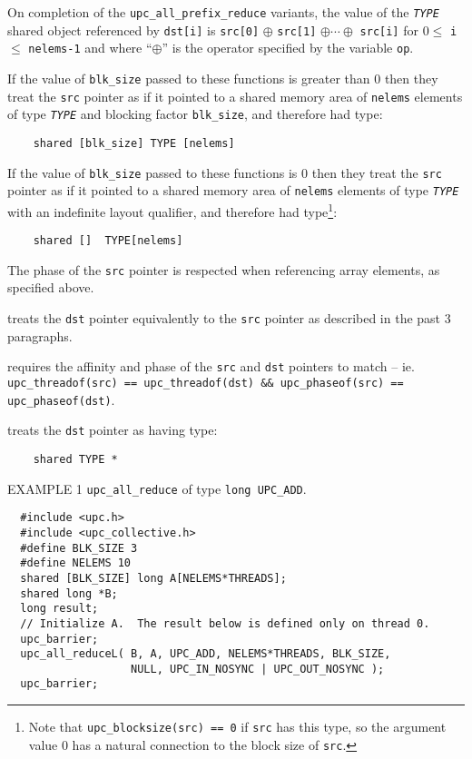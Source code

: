 \np On completion of the {\tt upc\_all\_prefix\_reduce} variants, 
the value of the {\tt{\em TYPE}} shared object
referenced by {\tt dst[i]} is
{\tt src[0]} $\oplus$ {\tt src[1]}
$\oplus \cdots \oplus$ {\tt src[i]}
for $0 \leq$ {\tt i} $\leq$ {\tt nelems-1} and
where ``$\oplus$'' is the operator specified by the variable {\tt op}.

\np
If the value of {\tt blk\_size} passed to these functions is
greater than 0 then they treat the {\tt src} pointer
as if it pointed to a shared memory area of {\tt nelems} elements of
type {\tt{\em TYPE}} and blocking factor {\tt blk\_size}, and therefore
had type:

\begin{verbatim}
    shared [blk_size] TYPE [nelems]
\end{verbatim}

\np
If the value of {\tt blk\_size} passed to these functions is
0 then they treat the {\tt src} pointer
as if it pointed to a shared memory area of {\tt nelems} elements of
type {\tt{\em TYPE}} with an indefinite layout qualifier, and
therefore had
type\footnote{Note that {\tt upc\_blocksize(src) == 0} if
{\tt src} has this type, so the argument value 0 has a natural
connection to the block size of {\tt src}.}:

\begin{verbatim}
    shared []  TYPE[nelems]
\end{verbatim}

\np The phase of the {\tt src} pointer is respected when
referencing array elements, as specified above.

 treats the {\tt dst} pointer
    equivalently to the {\tt src} pointer as described in the past 3
    paragraphs.
    
 requires the affinity and
phase of the {\tt src} and {\tt dst} pointers to match -- ie. 
{\tt upc\_threadof(src) == upc\_threadof(dst) \&\& upc\_phaseof(src) == upc\_phaseof(dst)}.

 treats the {\tt dst} pointer as having type:

\begin{verbatim}
    shared TYPE *
\end{verbatim}

\np EXAMPLE 1 {\tt upc\_all\_reduce} of type {\tt long UPC\_ADD}.
\begin{verbatim}
  #include <upc.h>
  #include <upc_collective.h>
  #define BLK_SIZE 3
  #define NELEMS 10
  shared [BLK_SIZE] long A[NELEMS*THREADS];
  shared long *B;
  long result;
  // Initialize A.  The result below is defined only on thread 0.
  upc_barrier;
  upc_all_reduceL( B, A, UPC_ADD, NELEMS*THREADS, BLK_SIZE,
                   NULL, UPC_IN_NOSYNC | UPC_OUT_NOSYNC );
  upc_barrier;
\end{verbatim}

